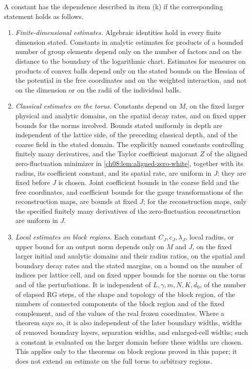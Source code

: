 \begin{definition}\label{ch01:conv:constants}
A constant has the dependence described in item (k) if the corresponding statement holds as follows.
\begin{enumerate}
\item[(1)] \emph{Finite-dimensional estimates.} Algebraic identities hold in every finite dimension stated. Constants in analytic estimates for products of a bounded number of group elements depend only on the number of factors and on the distance to the boundary of the logarithmic chart. Estimates for measures on products of convex balls depend only on the stated bounds on the Hessian of the potential in the free coordinates and on the weighted interaction, and not on the dimension or on the radii of the individual balls.
\item[(2)] \emph{Classical estimates on the torus.} Constants depend on $M$, on the fixed larger physical and analytic domains, on the spatial decay rates, and on fixed upper bounds for the norms involved. Bounds stated uniformly in depth are independent of the lattice side, of the preceding classical depth, and of the coarse field in the stated domain. The explicitly named constants controlling finitely many derivatives, and the Taylor coefficient majorant $Z$ of the aligned zero-fluctuation minimizer in \cref{ch08:lem:aligned-zero-white}, together with its radius, its coefficient constant, and its spatial rate, are uniform in $J$: they are fixed before $J$ is chosen. Joint coefficient bounds in the coarse field and the free coordinates, and coefficient bounds for the gauge transformations of the reconstruction maps, are bounds at fixed $J$; for the reconstruction maps, only the specified finitely many derivatives of the zero-fluctuation reconstruction are uniform in $J$.
\item[(3)] \emph{Local estimates on block regions.} Each constant $C_J,c_J,\lambda_J$, local radius, or upper bound for an output norm depends only on $M$ and $J$, on the fixed larger initial and analytic domains and their radius ratios, on the spatial and boundary decay rates and the stated margins, on a bound on the number of indices per lattice cell, and on fixed upper bounds for the norms on the torus and of the perturbations. It is independent of $L,\gamma,m,N,K,d_0$, of the number of elapsed RG steps, of the shape and topology of the block region, of the numbers of connected components of the block region and of the fixed complement, and of the values of the real frozen coordinates. Where a theorem says so, it is also independent of the later boundary widths, widths of removed boundary layers, separation widths, and enlarged-cell widths; such a constant is evaluated on the larger domain before these widths are chosen. This applies only to the theorems on block regions proved in this paper; it does not extend an estimate on the full torus to arbitrary regions.

\end{enumerate}
\end{definition}
